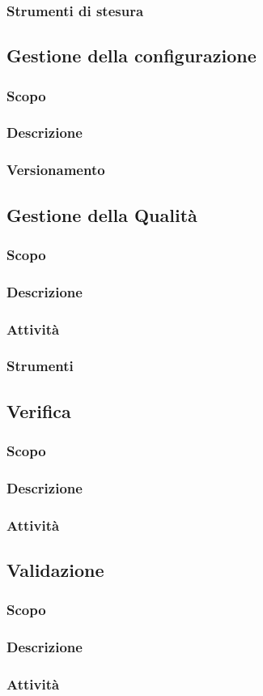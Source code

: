         \subsubsection{Strumenti di stesura}
            \subsubsubsection{\LaTeX}
    \subsection{Gestione della configurazione}
        \subsubsection{Scopo}
        \subsubsection{Descrizione}
        \subsubsection{Versionamento}
    \subsection{Gestione della Qualità}
        \subsubsection{Scopo}
        \subsubsection{Descrizione}
        \subsubsection{Attività}
        \subsubsection{Strumenti}
    \subsection{Verifica}
        \subsubsection{Scopo}
        \subsubsection{Descrizione}
        \subsubsection{Attività}
    \subsection{Validazione}
        \subsubsection{Scopo}
        \subsubsection{Descrizione}
        \subsubsection{Attività}